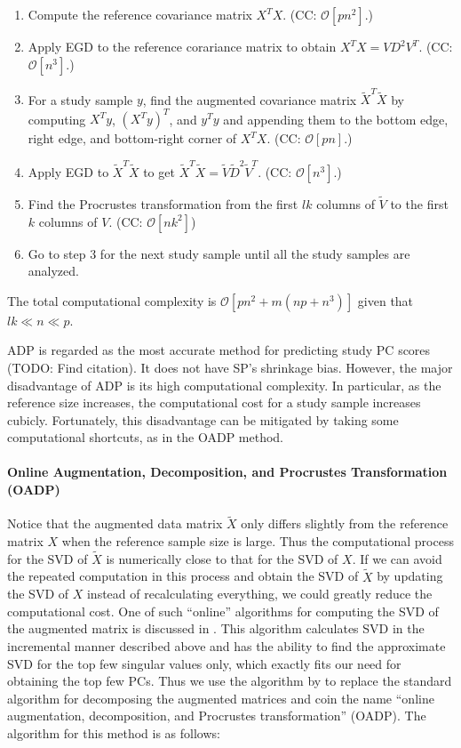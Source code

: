 \documentclass{article}
\newcommand{\bO}{\mathcal{O}}
\newcommand{\todo}[1]{{\color{red} (TODO: #1)}}
\begin{document}
\begin{enumerate}
\item Compute the reference covariance matrix $X^T X$.
  (CC: $\bO[pn^2]$.)  
\item Apply EGD to the reference corariance matrix
  to obtain $X^T X = V D^2 V^T$.
  (CC: $\bO[n^3]$.)
\item For a study sample $y$,
  find the augmented covariance matrix
  $\tilde{X}^T \tilde{X}$
  by computing $X^T y$, $(X^T y)^T$, and $y^T y$
  and appending them to the
  bottom edge,
  right edge,
  and bottom-right corner of $X^TX$.
  (CC: $\bO[pn]$.)
\item Apply EGD to $\tilde{X}^T \tilde{X}$ to get $\tilde{X}^T \tilde{X} = \tilde{V} \tilde{D}^2 \tilde{V}^T$.
  (CC: $\bO[n^3]$.)
\item Find the Procrustes transformation
from the first $lk$ columns of $\tilde{V}$
to the first $k$ columns of $V$.
  (CC: $\bO[nk^2]$)
  \item Go to step 3 for the next study sample
  until all the study samples are analyzed.
\end{enumerate}
The total computational complexity is
$\bO[pn^2 + m(np + n^3)]$
given that $lk \ll n \ll p$.

ADP is regarded as the most accurate method for predicting study PC scores \todo{Find citation}.
It does not have SP's shrinkage bias.
However, the major disadvantage of ADP
is its high computational complexity.
In particular,
as the reference size increases,
the computational cost for a study sample
increases cubicly.
Fortunately, this disadvantage can be mitigated by taking some computational shortcuts,
as in the OADP method.

\paragraph{Online Augmentation, Decomposition, and Procrustes Transformation (OADP)}

Notice that the augmented data matrix $\tilde{X}$
only differs slightly from the reference matrix $X$
when the reference sample size is large.
Thus the computational process for the SVD of $\tilde{X}$
is numerically close to that for the SVD of $X$.
If we can avoid the repeated computation in this process
and obtain the SVD of $\tilde{X}$
by updating the SVD of $X$
instead of recalculating everything,
we could greatly reduce the computational cost.
One of such ``online'' algorithms for computing the SVD of the augmented matrix is discussed in \citet{brand2002incremental}.
This algorithm calculates SVD in the incremental manner described above
and has the ability to find the approximate SVD for the top few singular values only,
which exactly fits our need for obtaining the top few PCs.
Thus we use the algorithm by \citet{brand2002incremental}
to replace the standard algorithm for decomposing the augmented matrices
and coin the name ``online augmentation, decomposition, and Procrustes transformation'' (OADP).
The algorithm for this method is as follows:
\end{document}
